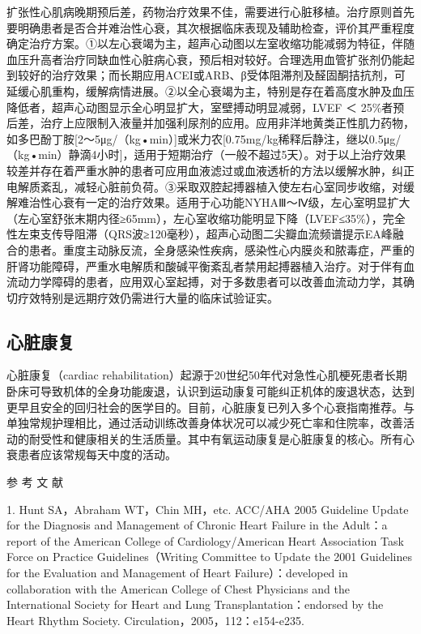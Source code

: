 扩张性心肌病晚期预后差，药物治疗效果不佳，需要进行心脏移植。治疗原则首先要明确患者是否合并难治性心衰，其次根据临床表现及辅助检查，评价其严重程度确定治疗方案。①以左心衰竭为主，超声心动图以左室收缩功能减弱为特征，伴随血压升高者治疗同缺血性心脏病心衰，预后相对较好。合理选用血管扩张剂仍能起到较好的治疗效果；而长期应用ACEI或ARB、β受体阻滞剂及醛固酮拮抗剂，可延缓心肌重构，缓解病情进展。②以全心衰竭为主，特别是存在着高度水肿及血压降低者，超声心动图显示全心明显扩大，室壁搏动明显减弱，LVEF
＜
25\%者预后差，治疗上应限制入液量并加强利尿剂的应用。应用非洋地黄类正性肌力药物，如多巴酚丁胺{[}2～5μg/（kg•min）{]}或米力农{[}0.75mg/kg稀释后静注，继以0.5μg/（kg•min）静滴4小时{]}，适用于短期治疗（一般不超过5天）。对于以上治疗效果较差并存在着严重水肿的患者可应用血液滤过或血液透析的方法以缓解水肿，纠正电解质紊乱，减轻心脏前负荷。③采取双腔起搏器植入使左右心室同步收缩，对缓解难治性心衰有一定的治疗效果。适用于心功能NYHAⅢ～Ⅳ级，左心室明显扩大（左心室舒张末期内径≥65mm），左心室收缩功能明显下降（LVEF≤35\%），完全性左束支传导阻滞（QRS波≥120毫秒），超声心动图二尖瓣血流频谱提示EA峰融合的患者。重度主动脉反流，全身感染性疾病，感染性心内膜炎和脓毒症，严重的肝肾功能障碍，严重水电解质和酸碱平衡紊乱者禁用起搏器植入治疗。对于伴有血流动力学障碍的患者，应用双心室起搏，对于多数患者可以改善血流动力学，其确切疗效特别是远期疗效仍需进行大量的临床试验证实。

\subsection{心脏康复}

心脏康复（cardiac
rehabilitation）起源于20世纪50年代对急性心肌梗死患者长期卧床可导致机体的全身功能废退，认识到运动康复可能纠正机体的废退状态，达到更早且安全的回归社会的医学目的。目前，心脏康复已列入多个心衰指南推荐。与单独常规护理相比，通过活动训练改善身体状况可以减少死亡率和住院率，改善活动的耐受性和健康相关的生活质量。其中有氧运动康复是心脏康复的核心。所有心衰患者应该常规每天中度的活动。

\protect\hypertarget{text00075.html}{}{}

\hypertarget{text00075.htmlux5cux23CHP3-3-4}{}
参 考 文 献

1. Hunt SA，Abraham WT，Chin MH，etc. ACC/AHA 2005 Guideline Update for
the Diagnosis and Management of Chronic Heart Failure in the Adult：a
report of the American College of Cardiology/American Heart Association
Task Force on Practice Guidelines（Writing Committee to Update the 2001
Guidelines for the Evaluation and Management of Heart
Failure）：developed in collaboration with the American College of Chest
Physicians and the International Society for Heart and Lung
Transplantation：endorsed by the Heart Rhythm Society.
Circulation，2005，112：e154-e235.

